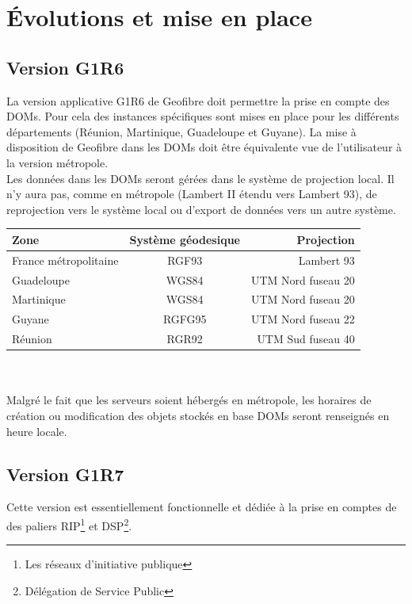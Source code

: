 

\chapter{\'Evolutions et mise en place}
\section{Version G1R6}

La version applicative G1R6 de Geofibre doit permettre la prise en compte des DOMs. Pour cela des instances spécifiques sont mises en place  pour les différents départements (Réunion, Martinique, Guadeloupe et Guyane).
La mise à disposition de Geofibre dans les DOMs doit être équivalente vue de l’utilisateur à la version métropole.
\\Les données dans les DOMs seront gérées dans le système de projection local. Il n’y aura pas, comme en métropole (Lambert II étendu vers Lambert 93), de reprojection vers le système local ou d’export de données vers un autre système.\\

\begin{tabular}{|l|c|r|}
  \hline
    Zone & Système géodesique & Projection \\
  \hline
  France métropolitaine & RGF93 & Lambert 93 \\
  Guadeloupe & WGS84 & UTM Nord fuseau 20 \\
  Martinique & WGS84 & UTM Nord fuseau 20 \\
  Guyane & RGFG95 & UTM Nord fuseau 22 \\
  Réunion & RGR92 & UTM Sud fuseau 40 \\
  \hline
\end{tabular}\\\\

Malgré le fait que les serveurs soient hébergés en métropole, les horaires de création ou modification des objets stockés en base DOMs seront renseignés en heure locale.

\section{Version G1R7}
Cette version est essentiellement  fonctionnelle et dédiée à la prise en comptes de des paliers RIP\footnote{Les réseaux d’initiative publique} et DSP\footnote{Délégation de Service Public}.

